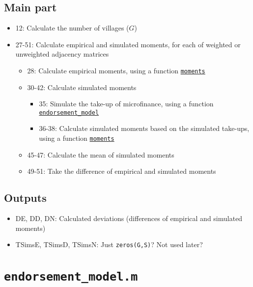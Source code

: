 \documentclass[10pt,letterpaper]{article}
\begin{document}
\subsection*{Main part}
\begin{itemize}
  \item 12: Calculate the number of villages ($G$)
  \item 27-51: Calculate empirical and simulated moments, for each of weighted or unweighted adjacency matrices
    \begin{itemize}
      \item 28: Calculate empirical moments, using a function \hyperref[moments]{\texttt{moments}}
      \item 30-42: Calculate simulated moments
        \begin{itemize}
          \item 35: Simulate the take-up of microfinance, using a function \hyperref[endorsement_model]{\texttt{endorsement\_model}}
          \item 36-38: Calculate simulated moments based on the simulated take-ups, using a function \hyperref[moments]{\texttt{moments}}
        \end{itemize}
      \item 45-47: Calculate the mean of simulated moments
      \item 49-51: Take the difference of empirical and simulated moments
    \end{itemize}
\end{itemize}

\subsection*{Outputs}
\begin{itemize}
  \item DE, DD, DN: Calculated deviations (differences of empirical and simulated moments)
  \item TSimsE, TSimsD, TSimsN: Just \texttt{zeros(G,S)}? Not used later?
\end{itemize}

\section{\texttt{endorsement\_model.m}}\label{endorsement_model}
\end{document}
